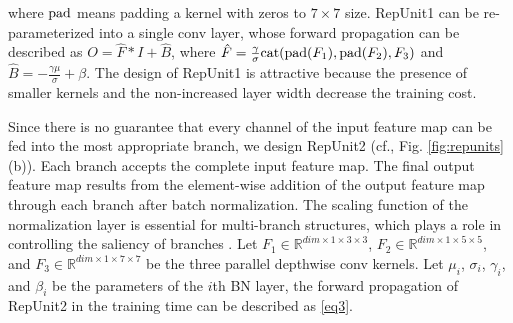 \documentclass[preprint,12pt]{elsarticle}
\begin{document}
\noindent
where ${\rm pad}$ means padding a kernel with zeros to $7 \times 7$ size. RepUnit1 can be re-parameterized into a single conv layer, whose forward propagation can be described as $O = \hat{F}*I + \hat{B}$, where $\hat{F}=\frac{\gamma}{\sigma}{\rm cat}({\rm pad}(F_1), {\rm pad}(F_2), F_3)$ and $\hat{B} =-\frac{\gamma\mu}{\sigma} + \beta$. The design of RepUnit1 is attractive because the presence of smaller kernels and the non-increased layer width decrease the training cost.

Since there is no guarantee that every channel of the input feature map can be fed into the most appropriate branch, we design RepUnit2 (cf., Fig. \ref{fig:repunits}(b)). Each branch accepts the complete input feature map. The final output feature map results from the element-wise addition of the output feature map through each branch after batch normalization. The scaling function of the normalization layer is essential for multi-branch structures, which plays a role in controlling the saliency of branches \cite{online}. Let $F_1 \in \mathbb{R}^{dim \times 1 \times 3 \times 3}$, $F_2 \in \mathbb{R}^{dim \times 1 \times 5 \times 5}$, and $F_3 \in \mathbb{R}^{dim \times 1 \times 7 \times 7}$ be the three parallel depthwise conv kernels. Let $\mu_i$, $\sigma_i$, $\gamma_i$, and $\beta_i$ be the parameters of the $i$th BN layer, the forward propagation of RepUnit2 in the training time can be described as \eqref{eq3}.
\end{document}
